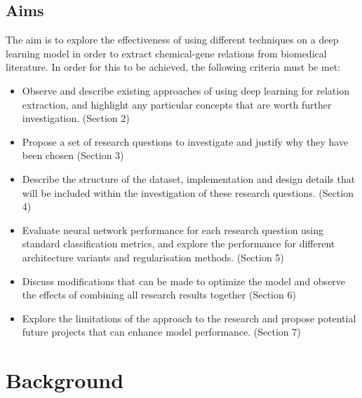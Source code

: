 \documentclass{l4proj}
\begin{document}
\newpage
\section{Aims}
The aim is to explore the effectiveness of using different techniques on a deep learning model in order to extract chemical-gene relations from biomedical literature. In order for this to be achieved, the following criteria must be met:
\begin{itemize}
    \item Observe and describe existing approaches of using deep learning for relation extraction, and highlight any particular concepts that are worth further investigation. (Section 2)
    \item Propose a set of research questions to investigate and justify why they have been chosen (Section 3) 
    \item Describe the structure of the dataset, implementation and design details that will be included within the investigation of these research questions. (Section 4)
    \item Evaluate neural network performance for each research question using standard classification metrics, and explore the performance for different architecture variants and regularisation methods. (Section 5)
    \item Discuss modifications that can be made to optimize the model and observe the effects of combining all research results together (Section 6) 
    \item Explore the limitations of the approach to the research and propose potential future projects that can enhance model performance. (Section 7)
\end{itemize}

\chapter{Background}

\end{document}
